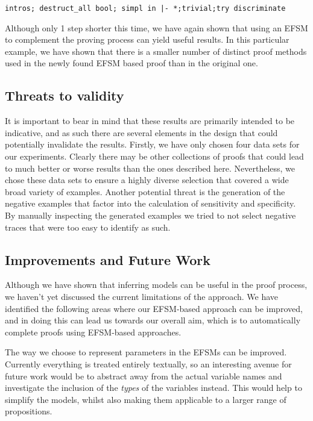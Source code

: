 \documentclass{llncs}
\begin{document}
\vspace{2mm}
\noindent\texttt{intros; destruct\_all bool; simpl in |- *;trivial;try discriminate}
\vspace{2mm}

\noindent Although only 1 step shorter this time, we have again shown that using an EFSM to complement the proving process can yield useful results. In this particular example, we have shown that there is a smaller number of distinct proof methods used in the newly found EFSM based proof than in the original one.

\subsection{Threats to validity}
It is important to bear in mind that these results are primarily intended to be indicative, and as such there are several elements in the design that could potentially invalidate the results. Firstly, we have only chosen four data sets for our experiments. Clearly there may be other collections of proofs that could lead to much better or worse results than the ones described here. Nevertheless, we chose these data sets to ensure a highly diverse selection that covered a wide broad variety of examples. Another potential threat is the generation of the negative examples that factor into the calculation of sensitivity and specificity. By manually inspecting the generated examples we tried to not select negative traces that were too easy to identify as such.

\subsection{Improvements and Future Work}
Although we have shown that inferring models can be useful in the proof process, we haven't yet discussed the current limitations of the approach. We have identified the following areas where our EFSM-based approach can be improved, and in doing this can lead us towards our overall aim, which is to automatically complete proofs using EFSM-based approaches. 

The way we choose to represent parameters in the EFSMs can be improved. Currently everything is treated entirely textually, so an interesting avenue for future work would be to abstract away from the actual variable names and investigate the inclusion of the \emph{types} of the variables instead. This would help to simplify the models, whilst also making them applicable to a larger range of propositions.
\end{document}
